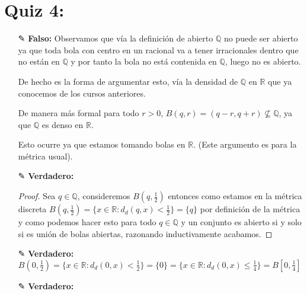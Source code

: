 \section{Quiz 4:}

\begin{itemize}[leftmargin=*]
\item[✎] \textbf{Falso: }Observamos que vía la definición de abierto $\mathbb{Q}$ no puede ser abierto ya que toda bola con centro en un racional va a tener irracionales dentro que no están en $\mathbb{Q}$ y por tanto la bola no está contenida en $\mathbb{Q}$, luego no es abierto.

De hecho es la forma de argumentar esto, vía la densidad de $\mathbb{Q}$ en $\mathbb{R}$ que ya conocemos de los cursos anteriores.

De manera más formal para todo $r>0$, $B(q,r)=(q-r,q+r) \not \subseteq \mathbb{Q}$, ya que $\mathbb{Q}$ es denso en $\mathbb{R}$.

Esto ocurre ya que estamos tomando bolas en $\mathbb{R}$. (Este argumento es para la métrica usual).

\item[✎] \textbf{Verdadero: } \\
\begin{proof}
    Sea $q \in \mathbb{Q}$, consideremos $B(q,\frac{1}{2})$ entonces como estamos en la métrica discreta $B(q,\frac{1}{2})=\{x\in \mathbb{R}:d_d(q,x)<\frac{1}{2}\}=\{q\}$ por definición de la métrica y como podemos hacer esto para todo $q\in \mathbb{Q}$ y un conjunto es abierto si y solo si es unión de bolas abiertas, razonando inductivamente acabamos.
\end{proof}


\item[✎] \textbf{Verdadero: }$B(0,\frac{1}{2})=\{x\in \mathbb{R} : d_d(0,x)<\frac{1}{2}\}=\{0\}=\{x \in \mathbb{R} : d_d(0,x)\leq \frac{1}{4}\}=B[0,\frac{1}{4}]$

\item[✎]\textbf{Verdadero: }\\

\begin{tikznt}
\centering
{}
\end{tikznt}
\end{itemize}
